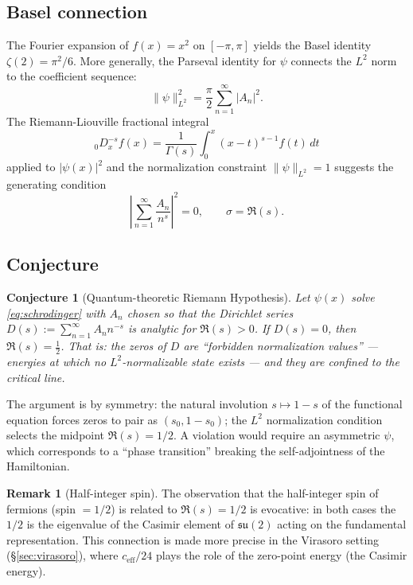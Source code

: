 \documentclass[%
 aip,
 amsmath,amssymb,
 reprint,%
]{revtex4-1}
\theoremstyle{plain}
\newtheorem{conjecture}{Conjecture}[section]
\theoremstyle{definition}
\newtheorem{remark}[theorem]{Remark}
\begin{document}
\subsection{Basel connection}

The Fourier expansion of $f(x) = x^2$ on $[-\pi,\pi]$ yields the Basel identity
$\zeta(2) = \pi^2/6$.  More generally, the Parseval identity for $\psi$ connects
the $L^2$ norm to the coefficient sequence:
\[
\|\psi\|_{L^2}^2 = \frac{\pi}{2}\sum_{n=1}^\infty |A_n|^2.
\]
The Riemann-Liouville fractional integral~\cite{Hadamard1892,Hermann2014}
\[
{}_0D_x^{-s} f(x) = \frac{1}{\Gamma(s)}\int_0^x (x-t)^{s-1} f(t)\,dt
\]
applied to $|\psi(x)|^2$ and the normalization constraint $\|\psi\|_{L^2} = 1$
suggests the generating condition
\begin{equation}
\left|\sum_{n=1}^\infty \frac{A_n}{n^s}\right|^2 = 0, \qquad \sigma = \Re(s).
\label{eq:norm_zero}
\end{equation}

\subsection{Conjecture}

\begin{conjecture}[Quantum-theoretic Riemann Hypothesis]
\label{conj:qzeta}
Let $\psi(x)$ solve \eqref{eq:schrodinger} with $A_n$ chosen so that the
Dirichlet series $D(s) := \sum_{n=1}^\infty A_n n^{-s}$ is analytic for $\Re(s)>0$.
If $D(s) = 0$, then $\Re(s) = \tfrac12$. That is: the zeros of $D$ are
``forbidden normalization values'' --- energies at which no $L^2$-normalizable
state exists --- and they are confined to the critical line.
\end{conjecture}

The argument is by symmetry: the natural involution $s \mapsto 1-s$ of the
functional equation forces zeros to pair as $(s_0, 1-s_0)$; the $L^2$
normalization condition selects the midpoint $\Re(s) = 1/2$.
A violation would require an asymmetric $\psi$, which corresponds to a
``phase transition'' breaking the self-adjointness of the Hamiltonian.

\begin{remark}[Half-integer spin]
\label{rem:spin}
The observation that the half-integer spin of fermions (spin $= 1/2$) is
related to $\Re(s) = 1/2$ is evocative: in both cases the $1/2$ is the
eigenvalue of the Casimir element of $\mathfrak{su}(2)$ acting on the
fundamental representation. This connection is made more precise in the
Virasoro setting (\S\ref{sec:virasoro}), where $c_{\mathrm{eff}}/24$ plays
the role of the zero-point energy (the Casimir energy).
\end{remark}
\end{document}
